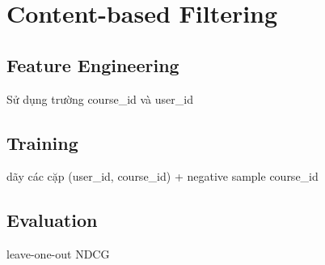 \section{Content-based Filtering}
\subsection{Feature Engineering}
Sử dụng trường course\_id và user\_id
\subsection{Training}
dãy các cặp (user\_id, course\_id) + negative sample course\_id
\subsection{Evaluation}
leave-one-out NDCG
